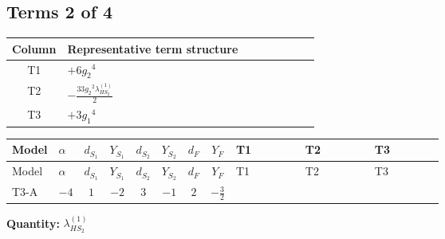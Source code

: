 \documentclass[8pt]{article}
\begin{document}
\begin{landscape}
\subsection*{Terms 2 of 4}
\begin{center}
\begin{tabular}{@{}c >{\raggedright\arraybackslash}p{0.82\linewidth}@{}}
\toprule
Column & Representative term structure \\
\midrule
T1 & \(\displaystyle +6 {g_2}^4\) \\
\midrule
T2 & \(\displaystyle -\frac{33 {g_2}^2 {\lambda_{HS_2}^{(1)}}}{2}\) \\
\midrule
T3 & \(\displaystyle +3 {g_1}^4\) \\
\midrule
\bottomrule
\end{tabular}
\end{center}
\smallskip
\tiny
\begin{longtable}{@{}llcccccc >{\raggedright\arraybackslash}p{0.21\linewidth} >{\raggedright\arraybackslash}p{0.21\linewidth} >{\raggedright\arraybackslash}p{0.21\linewidth}@{}}
\toprule
Model & $\alpha$ & $d_{S_1}$ & $Y_{S_1}$ & $d_{S_2}$ & $Y_{S_2}$ & $d_F$ & $Y_F$ & T1 & T2 & T3 \\
\midrule
\endfirsthead
\toprule
Model & $\alpha$ & $d_{S_1}$ & $Y_{S_1}$ & $d_{S_2}$ & $Y_{S_2}$ & $d_F$ & $Y_F$ & T1 & T2 & T3 \\
\midrule
\endhead
T3-A & $-4$ & $1$ & $-2$ & $3$ & $-1$ & $2$ & $-\frac{3}{2}$ & \scriptsize\adjustbox{max width=\linewidth}{$\begin{gathered} +6 {g_2}^4\end{gathered}$} & \scriptsize\adjustbox{max width=\linewidth}{$\begin{gathered} -\frac{33 {g_2}^2 {\lambda_{HS_2}^{(1)}}}{2}\end{gathered}$} & \scriptsize\adjustbox{max width=\linewidth}{$\begin{gathered} +3 {g_1}^4\end{gathered}$} \\
\midrule
\bottomrule
\end{longtable}
\clearpage
\noindent\textbf{Quantity: }$\lambda_{HS_2}^{(1)}$\par\smallskip

\end{landscape}
\end{document}
